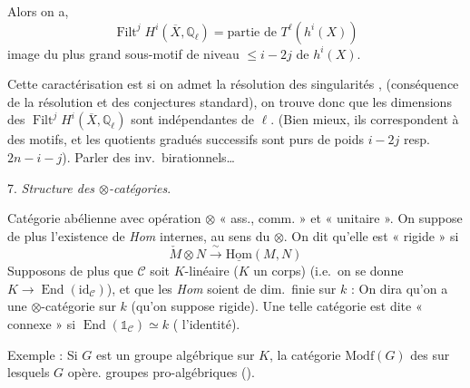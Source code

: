\documentclass[11pt,a4paper]{article}
\begin{document}

Alors on a, 
\[
  \operatorname{Filt}^{j} H^{i}(\overline{X}, \mathbb{Q}_{\ell}) =
  \text{partie de } T^{\ell}(h^{i}(X))
\]
 image du plus grand sous-motif  de niveau $\leq i-2j$ de $h^{i}(X)$.

Cette caractérisation  est \ill{} \ill{}
 si on admet la résolution des singularités
,
\struck{\ill{}} (conséquence de la résolution et des conjectures standard),
on trouve donc que les dimensions des
$\operatorname{Filt}^{j} H^{i}(\overline{X}, \mathbb{Q}_{\ell})$ sont
indépendantes de $\ell$. (Bien mieux, ils correspondent à des motifs, et les
quotients gradués successifs sont \struck{\ill{}} purs de poids $i-2j$
resp.\ $2n-i-j$). Parler des inv.\ birationnels…


7. \emph{Structure des $\otimes$-catégories}. 

 Catégorie abélienne avec opération $\otimes$ « ass.,
comm. » et « unitaire ». On suppose de plus l'existence de \emph{Hom}
internes, au sens du $\otimes$. On dit qu'elle est « rigide » si
\[
  \check{M} \otimes N \xrightarrow{\ \sim\ } \underline{\mathrm{Hom}}(M, N)
\]
Supposons de plus que $\mathcal{C}$ soit $K$-linéaire ($K$ un corps) (i.e.\ on se donne $K \to \operatorname{End}(\mathrm{id}_{\mathcal{C}})$), et que
les \emph{Hom} soient de dim.\ finie sur $k$ : \struck{\ill{}} On dira qu'on
a une $\otimes$-catégorie sur $k$ (qu'on suppose rigide). Une telle catégorie
est dite « connexe » si
$\operatorname{End}(\mathbb{1}_{\mathcal{C}}) \simeq k$ (
l'identité).

Exemple : Si $G$ est un groupe algébrique sur $K$, la catégorie
$\mathrm{Modf}(G)$ des  sur lesquels $G$ opère.
  groupes pro-algébriques
().
\end{document}
